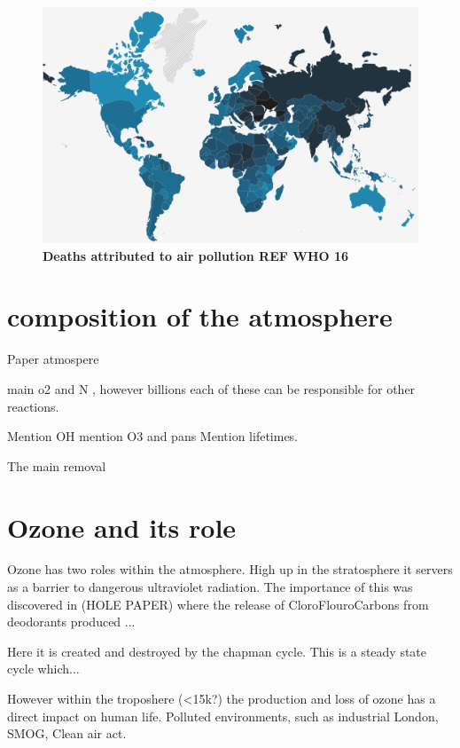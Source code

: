 \begin{figure}[H]
  \centering
  \includegraphics[width=\textwidth]{who.png}
  \caption{\textbf{Deaths attributed to air pollution REF WHO 16}}
  \label{fig:who}
\end{figure}





\section{composition of the atmosphere}




Paper atmospere

main o2 and N ,
however billions
each of these can be responsible for other reactions.

Mention OH mention O3 and pans
Mention lifetimes.




The main removal


\section{Ozone and its role}
Ozone has two roles within the atmosphere. High up in the stratosphere it servers as a barrier to dangerous ultraviolet radiation. The importance of this was discovered in (HOLE PAPER) where the release of CloroFlouroCarbons from deodorants produced ...

Here it is created and destroyed by the chapman cycle. This is a steady state cycle which...


However within the troposhere (<15k?) the production and loss of ozone has a direct impact on human life. Polluted environments, such as industrial London,
SMOG, Clean air act.




